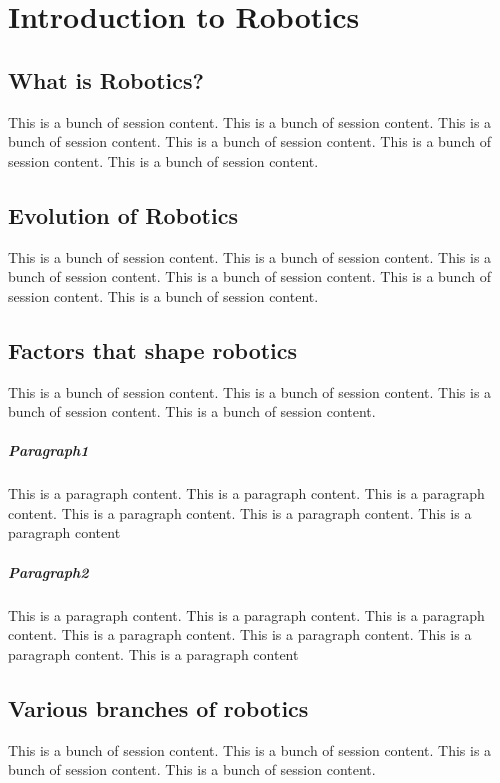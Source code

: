 \chapter{Introduction to Robotics}
\label{ch:intro-robotics}

\section{What is Robotics?}
This is a bunch of session content. This is a bunch of session content. This is a bunch of session content. This is a bunch of session content. This is a bunch of session content. This is a bunch of session content. %

\section{Evolution of Robotics}
This is a bunch of session content. This is a bunch of session content. This is a bunch of session content. This is a bunch of session content. This is a bunch of session content. This is a bunch of session content. %

\section{Factors that shape robotics}
This is a bunch of session content. This is a bunch of session content. This is a bunch of session content. This is a bunch of session content.
\paragraph{Paragraph1}
This is a paragraph content. This is a paragraph content. This is a paragraph content. This is a paragraph content. This is a paragraph content. This is a paragraph content
\paragraph{Paragraph2}
This is a paragraph content. This is a paragraph content. This is a paragraph content. This is a paragraph content. This is a paragraph content. This is a paragraph content. This is a paragraph content

\section{Various branches of robotics}
This is a bunch of session content. This is a bunch of session content. This is a bunch of session content. This is a bunch of session content.
